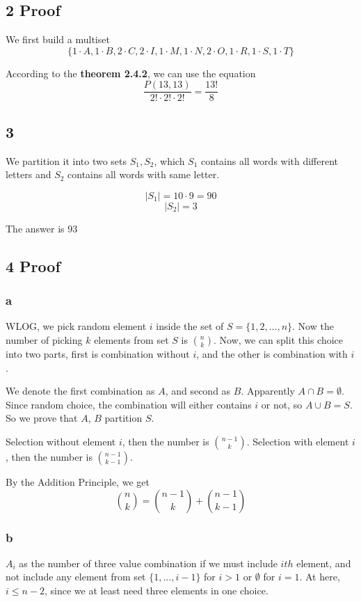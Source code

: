 \documentclass{article}
\begin{document}
\subsection*{2 Proof}

We first build a multiset $$\{1 \cdot A, 1 \cdot  B,  2 \cdot C, 2 \cdot I, 1 \cdot M, 1 \cdot N, 2 \cdot O, 1 \cdot R, 1 \cdot S, 1 \cdot T \}$$

According to the \textbf{theorem 2.4.2}, we can use the equation $$\frac{P(13, 13)}{2! \cdot 2! \cdot 2!} = \frac{13 !}{8}$$

\subsection*{3}

We partition it into two sets $S_1, S_2$, which $S_1$ contains all words with different letters and $S_2$ contains all words with same letter.

$$|S_1| = 10 \cdot 9 = 90$$
$$|S_2| = 3$$

The answer is $93$

\subsection*{4 Proof}
\subsubsection*{a}
WLOG, we pick random element $i$ inside the set of $S = \{1, 2, ..., n\}$. Now the number of picking $k$ elements from set $S$ is ${n \choose k }$. Now, we can split this choice into two parts, first is combination without $i$, and the other is combination with $i$.

We denote the first combination as $A$, and second as $B$. Apparently $A \cap B = \emptyset$. Since random choice, the combination will either contains $i$ or not, so $A \cup B = S$. So we prove that $A$, $B$ partition $S$.

Selection without element $i$, then the number is ${n - 1 \choose k}$.
Selection with element $i$, then the number is ${n - 1 \choose k - 1}$.

By the Addition Principle, we get $${n \choose k } = {n - 1 \choose k} + {n - 1 \choose k - 1}$$ 
\subsubsection*{b}

\denote $A_i$ as the number of three value combination if we must include $ith$ element, and not include any element from set $\{1, ..., i - 1 \}$ for $i > 1$ or $\emptyset$ for $i = 1$. At here, $i \leq n - 2$, since we at least need three elements in one choice.
\end{document}
